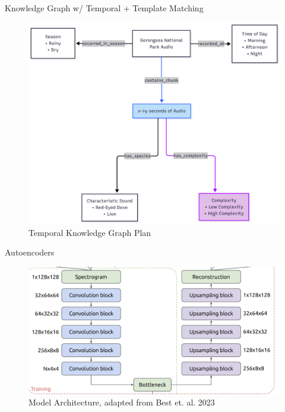 \begin{frame}{Knowledge Graph w/ Temporal + Template Matching}
    \centering
    \begin{figure}
        \includegraphics[height=\textheight,width=\textwidth,keepaspectratio]{images/temporalKG.jpg}
        \caption{Temporal Knowledge Graph Plan}
    \end{figure} 
\end{frame}

\begin{frame}{Autoencoders}
    \centering
    \begin{figure}
        \includegraphics[height=\textheight,width=\textwidth,keepaspectratio]{images/architecture.png}
        \caption{Model Architecture, adapted from Best et. al. 2023}
    \end{figure} 
\end{frame}
            


